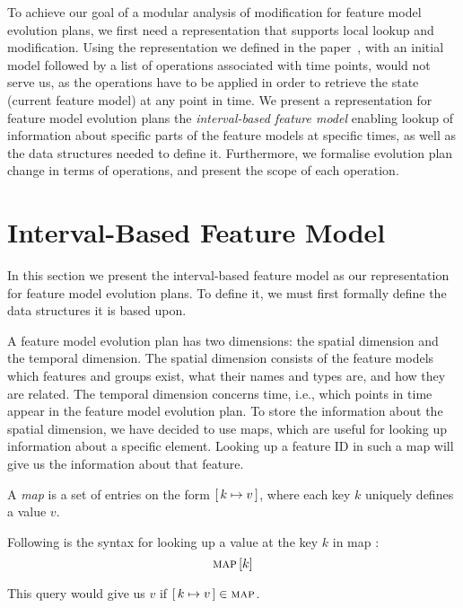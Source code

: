 To achieve our goal of a modular analysis of modification for feature model evolution plans, we first need a representation that supports local lookup and modification. Using the representation we defined in the paper~\cite{art:consistency-preserving-evolution-planning}, with an initial model followed by a list of operations associated with time points, would not serve us, as the operations have to be applied in order to retrieve the state (current feature model) at any point in time. We present a representation for feature model evolution plans \textemdash{} the \emph{interval-based feature model} \textemdash{} enabling lookup of information about specific parts of the feature models at specific times, as well as the data structures needed to define it. Furthermore, we formalise evolution plan change in terms of operations, and present the scope of each operation. 

\section{Interval-Based Feature Model}
\label{sec:interval-based-feature-model}
In this section we present the interval-based feature model as our representation for feature model evolution plans. To define it, we must first formally define the data structures it is based upon.

A feature model evolution plan has two dimensions: the spatial dimension and the temporal dimension. The spatial dimension consists of the feature models \textemdash{} which features and groups exist, what their names and types are, and how they are related. The temporal dimension concerns time, i.e., which points in time appear in the feature model evolution plan. To store the information about the spatial dimension, we have decided to use maps, which are useful for looking up information about a specific element. Looking up a feature ID in such a map will give us the information about that feature. 
\\

\begin{definition}[Map]
  A \emph{map} is a set of entries on the form $[ \,k \mapsto v\, ]$, where each key $k$ uniquely defines a value $v$. 
  \label{def:map}
\end{definition}

Following is the syntax for looking up a value at the key $k$ in map :
\[
  \textsc{map} \left[ k \right]
\]

This query would give us $v$ if $[ \,k \mapsto v\, ] \in \textsc{map}$.

